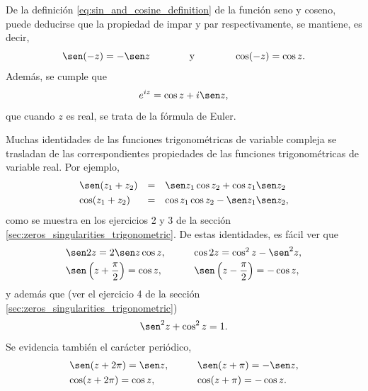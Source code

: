 \documentclass[a4paper]{report}
\begin{document}
De la definición \ref{eq:sin_and_cosine_definition} de la función seno y coseno, puede deducirse que la propiedad de impar y par respectivamente, se mantiene, es decir,
\begin{equation}\label{eq:sin_and_cosine_odd_even}
 \sen(-z)=-\sen z
 \qquad\qquad\textrm{y}\qquad\qquad 
 \cos(-z)=\cos z. 
\end{equation}
Además, se cumple que 
\begin{equation}\label{eq:euler_formula}
 e^{iz}=\cos z+i\sen z, 
\end{equation}
que cuando \(z\) es real, se trata de la fórmula de Euler.

Muchas identidades de las funciones trigonométricas de variable compleja se trasladan de las correspondientes propiedades de las funciones trigonométricas de variable real. Por ejemplo,
\begin{equation}\label{eq:sin_and_cosine_sum_arguments}
 \begin{array}{lll}
  \sen(z_1+z_2)&=&\sen z_1\cos z_2+\cos z_1\sen z_2\\[\smallskipamount]
  \cos(z_1+z_2)&=&\cos z_1\cos z_2-\sen z_1\sen z_2,
 \end{array} 
\end{equation}
como se muestra en los ejercicios 2 y 3 de la sección \ref{sec:zeros_singularities_trigonometric}. De estas identidades, es fácil ver que 
\begin{equation}\label{eq:sin_and_cosine_double_angle}
 \begin{array}{ll}
  \sen2z=2\sen z\cos z, &\qquad\cos2z=\cos^2z-\sen^2 z,\\[\smallskipamount]
  \sen\left(z+\dfrac{\pi}{2}\right)=\cos z, &\qquad \sen\left(z-\dfrac{\pi}{2}\right)=-\cos z, 
 \end{array} 
\end{equation}
y además que (ver el ejercicio 4 de la sección \ref{sec:zeros_singularities_trigonometric})
\begin{equation}\label{eq:sin_and_cosine_square_sum}
 \sen^2z+\cos^2z=1. 
\end{equation}
Se evidencia también el carácter periódico,  
\begin{equation}\label{eq:sin_and_cosine_periodicity}
 \begin{array}{ll}
  \sen(z+2\pi)=\sen z, &\qquad\sen(z+\pi)=-\sen z,\\[\smallskipamount]
  \cos(z+2\pi)=\cos z, &\qquad\cos(z+\pi)=-\cos z. 
 \end{array} 
\end{equation}
\end{document}
